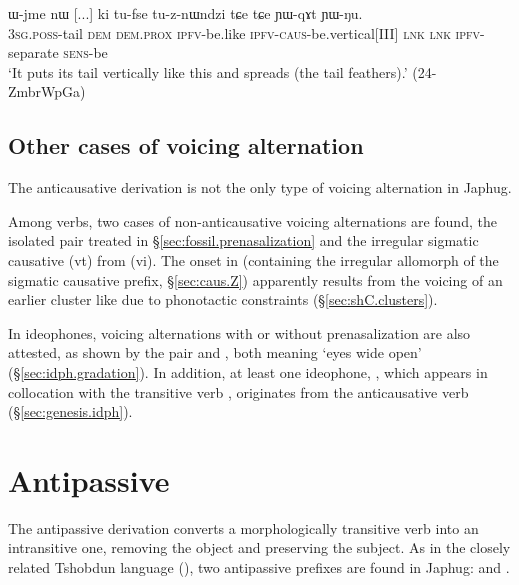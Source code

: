 \begin{exe}
\ex \label{ex:Wjme.YWqAt}
\gll ɯ-jme nɯ [...] ki tu-fse tu-z-nɯndzi tɕe tɕe ɲɯ-qɤt ɲɯ-ŋu. \\
\textsc{3sg}.\textsc{poss}-tail \textsc{dem}  {  }  \textsc{dem}.\textsc{prox} \textsc{ipfv}-be.like \textsc{ipfv}-\textsc{caus}-be.vertical[III] \textsc{lnk} \textsc{lnk} \textsc{ipfv}-separate \textsc{sens}-be \\
\glt `It puts its tail vertically like this and spreads (the tail feathers).' (24-ZmbrWpGa) 	
\end{exe}

\subsection{Other cases of voicing alternation} \label{sec:voicing.alternation.non.anticausative}
The anticausative derivation is not the only type of voicing alternation in Japhug. 

Among verbs, two cases of non-anticausative voicing alternations are found, the isolated pair treated in §\ref{sec:fossil.prenasalization} and the irregular sigmatic causative  (vt) from  (vi). The onset  in  (containing the irregular  allomorph of the sigmatic causative prefix, §\ref{sec:caus.Z}) apparently results from the voicing of an earlier cluster like   due to phonotactic constraints (§\ref{sec:shC.clusters}). 

In ideophones, voicing alternations with or without prenasalization are also attested, as shown by the pair  and , both meaning `eyes wide open' (§\ref{sec:idph.gradation}). In addition, at least one ideophone, , which appears in collocation with the transitive verb , originates from the anticausative verb  (§\ref{sec:genesis.idph}).

\section{Antipassive} \label{sec:antipassive}
The antipassive derivation converts a morphologically transitive verb into an intransitive one, removing the object and preserving the subject. As in the closely related Tshobdun language (\citealt[8]{jackson06paisheng}), two antipassive prefixes are found in Japhug:  and .


